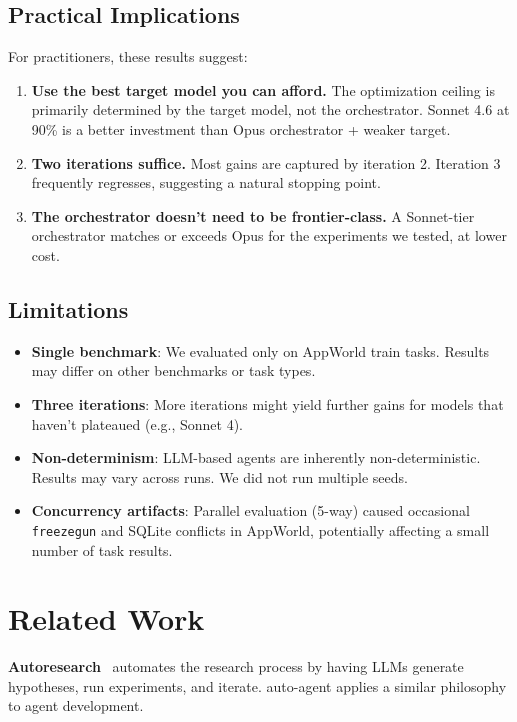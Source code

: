 \documentclass[11pt,a4paper]{article}
\begin{document}
\subsection{Practical Implications}

For practitioners, these results suggest:
\begin{enumerate}
    \item \textbf{Use the best target model you can afford.} The optimization ceiling is primarily determined by the target model, not the orchestrator. Sonnet 4.6 at 90\% is a better investment than Opus orchestrator + weaker target.
    \item \textbf{Two iterations suffice.} Most gains are captured by iteration 2. Iteration 3 frequently regresses, suggesting a natural stopping point.
    \item \textbf{The orchestrator doesn't need to be frontier-class.} A Sonnet-tier orchestrator matches or exceeds Opus for the experiments we tested, at lower cost.
\end{enumerate}

\subsection{Limitations}

\begin{itemize}
    \item \textbf{Single benchmark}: We evaluated only on AppWorld train tasks. Results may differ on other benchmarks or task types.
    \item \textbf{Three iterations}: More iterations might yield further gains for models that haven't plateaued (e.g., Sonnet 4).
    \item \textbf{Non-determinism}: LLM-based agents are inherently non-deterministic. Results may vary across runs. We did not run multiple seeds.
    \item \textbf{Concurrency artifacts}: Parallel evaluation (5-way) caused occasional \texttt{freezegun} and SQLite conflicts in AppWorld, potentially affecting a small number of task results.
\end{itemize}

\section{Related Work}

\textbf{Autoresearch}~\cite{autoresearch} automates the research process by having LLMs generate hypotheses, run experiments, and iterate. auto-agent applies a similar philosophy to agent development.
\end{document}

